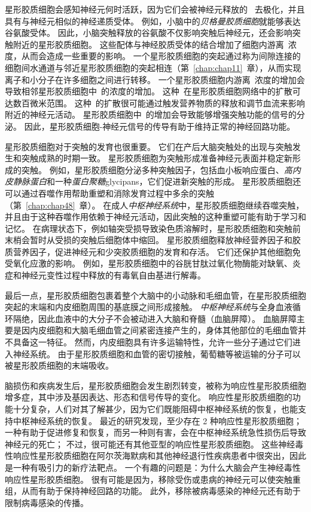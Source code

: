 星形胶质细胞会感知神经元何时活跃，因为它们会被神经元释放的~ 去极化，并且具有与神经元相似的神经递质受体。
例如，小脑中的\textit{贝格曼胶质细胞}就能够表达谷氨酸受体。
因此，小脑突触释放的谷氨酸不仅影响突触后神经元，还会影响突触附近的星形胶质细胞。
这些配体与神经胶质受体的结合增加了细胞内游离~浓度，从而会造成一些重要的影响。
一个星形胶质细胞的突起通过称为间隙连接的细胞间水通道与邻近星形胶质细胞的突起相连（第~\ref{chap:chap11}~章），从而实现离子和小分子在许多细胞之间进行转移。
一个星形胶质细胞内游离~浓度的增加会导致相邻星形胶质细胞中~的浓度的增加。
这种~在星形胶质细胞网络中的扩散可达数百微米范围。
这种~的扩散很可能通过触发营养物质的释放和调节血流来影响附近的神经元活动。
星形胶质细胞中~的增加会导致能够增强突触功能的信号的分泌。
因此，星形胶质细胞-神经元信号的传导有助于维持正常的神经回路功能。


星形胶质细胞对于突触的发育也很重要。
它们在产后大脑突触处的出现与突触发生和突触成熟的时期一致。
星形胶质细胞为突触形成准备神经元表面并稳定新形成的突触。
例如，星形胶质细胞分泌多种突触因子，包括血小板响应蛋白、\textit{高内皮静脉蛋白}和一种\textit{蛋白聚糖}glycipans，它们促进新突触的形成。
星形胶质细胞还可以通过吞噬作用帮助重塑和消除发育过程中多余的突触（第~\ref{chap:chap48}~章）。
在成人\textit{中枢神经系统}中，星形胶质细胞继续吞噬突触，并且由于这种吞噬作用依赖于神经元活动，因此突触的这种重塑可能有助于学习和记忆。
在病理状态下，例如轴突受损导致染色质溶解时，星形胶质细胞和突触前末梢会暂时从受损的突触后细胞体中缩回。
星形胶质细胞释放神经营养因子和胶质营养因子，促进神经元和少突胶质细胞的发育和存活。
它们还保护其他细胞免受氧化应激的影响。
例如，星形胶质细胞中的谷胱甘肽过氧化物酶能对缺氧、炎症和神经元变性过程中释放的有毒氧自由基进行解毒。


最后一点，星形胶质细胞包裹着整个大脑中的小动脉和毛细血管，在星形胶质细胞突起的末端和内皮细胞周围的基底膜之间形成接触。
\textit{中枢神经系统}与全身血液循环隔绝，因此血液中的大分子不会被动进入大脑和脊髓（血脑屏障）。
血脑屏障主要是因内皮细胞和大脑毛细血管之间紧密连接产生的，身体其他部位的毛细血管并不具备这一特征。
然而，内皮细胞具有许多运输特性，允许一些分子通过它们进入神经系统。
由于星形胶质细胞和血管的密切接触，葡萄糖等被运输的分子可以被星形胶质细胞的末端吸收。


脑损伤和疾病发生后，星形胶质细胞会发生剧烈转变，被称为响应性星形胶质细胞增多症，其中涉及基因表达、形态和信号传导的变化。
响应性星形胶质细胞的功能十分复杂，人们对其了解甚少，因为它们既能阻碍中枢神经系统的恢复，也能支持中枢神经系统的恢复。
最近的研究发现，至少存在 2 种响应性星形胶质细胞；
一种有助于促进修复和恢复，而另一种则有害，会在中枢神经系统急性损伤后导致神经元的死亡；
不过，很可能还有其他亚型的响应性星形胶质细胞。
这些神经毒性响应性星形胶质细胞在阿尔茨海默病和其他神经退行性疾病患者中很突出，因此是一种有吸引力的新疗法靶点。
一个有趣的问题是：为什么大脑会产生神经毒性响应性星形胶质细胞。
很有可能是因为，移除受伤或患病的神经元可以使突触重组，从而有助于保持神经回路的功能。
此外，移除被病毒感染的神经元还有助于限制病毒感染的传播。


